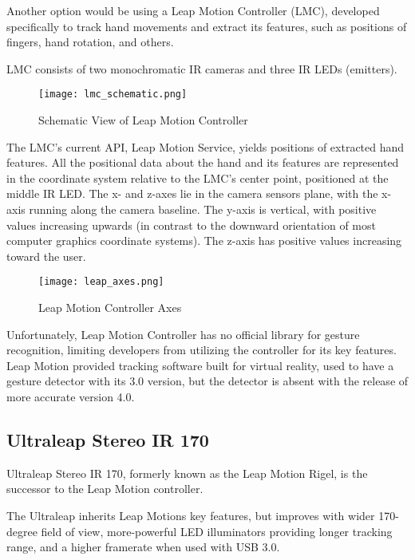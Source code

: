 Another option would be using a Leap Motion Controller (LMC), developed specifically to track hand movements and extract its features, such as positions of fingers, hand rotation, and others.

LMC consists of two monochromatic IR cameras and three IR LEDs (emitters). 

\begin{figure}[h]
	\centering
    \texttt{[image: lmc\_schematic.png]}
	\caption{Schematic View of Leap Motion Controller}
	\label{fig:lmcScheme}
\end{figure}



The LMC's current API, Leap Motion Service, yields positions of extracted hand features. All the positional data about the hand and its features are represented in the coordinate system relative to the LMC's center point, positioned at the middle IR LED.\cite{LMCanalysis} The x- and z-axes lie in the camera sensors plane, with the x-axis running along the camera baseline. The y-axis is vertical, with positive values increasing upwards (in contrast to the downward orientation of most computer graphics coordinate systems). The z-axis has positive values increasing toward the user.\cite{tomasMultileap}

\begin{figure}[H]
	\centering
    \texttt{[image: leap\_axes.png]}
	\caption{Leap Motion Controller Axes}
	\label{fig:lmcScheme}
\end{figure}

Unfortunately, Leap Motion Controller has no official library for gesture recognition, limiting developers from utilizing the controller for its key features. Leap Motion provided tracking software built for virtual reality, used to have a gesture detector with its 3.0 version, but the detector is absent with the release of more accurate version 4.0.

\subsection{Ultraleap Stereo IR 170}

Ultraleap Stereo IR 170, formerly known as the Leap Motion Rigel, is the successor to the Leap Motion controller.

The Ultraleap inherits Leap Motions key features, but improves with wider 170-degree field of view, more-powerful LED illuminators providing longer tracking range, and a higher framerate when used with USB 3.0.\cite{ultraleap}\cite{ultraleap2}

